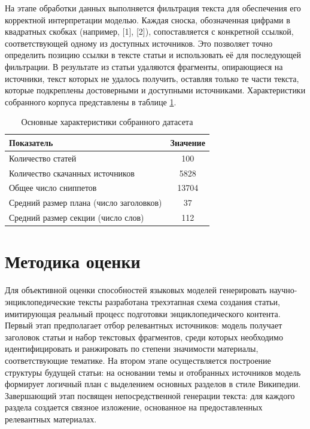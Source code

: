\documentclass{article}
\theoremstyle{definition}
\theoremstyle{plain}
\begin{document}
На этапе обработки данных выполняется фильтрация текста для обеспечения его корректной интерпретации моделью. 
Каждая сноска, обозначенная цифрами в квадратных скобках (например, [1], [2]), сопоставляется с конкретной ссылкой, соответствующей одному из доступных источников. 
Это позволяет точно определить позицию ссылки в тексте статьи и использовать её для последующей фильтрации. 
В результате из статьи удаляются фрагменты, опирающиеся на источники, текст которых не удалось получить, оставляя только те части текста,
которые подкреплены достоверными и доступными источниками. Характеристики собранного корпуса представлены в таблице \ref{tab:dataset}.

\begin{table}[htb]
  \centering
  \caption{Основные характеристики собранного датасета}
  \label{tab:dataset}
  \begin{tabular}{lc}
    \hline
    \textbf{Показатель} & \textbf{Значение} \\
    \hline
    Количество статей                             & 100    \\
    \hline
    Количество скачанных источников               & 5828  \\
    \hline
    Общее число сниппетов                         & 13704  \\
    \hline
    Средний размер плана (число заголовков)       & 37    \\
    \hline
    Средний размер секции (число слов)            & 112   \\
    \hline
  \end{tabular}
\end{table}


\section*{Методика оценки}
Для объективной оценки способностей языковых моделей генерировать научно-энциклопедические тексты разработана трехэтапная схема создания статьи, имитирующая реальный процесс подготовки энциклопедического контента. 
Первый этап предполагает отбор релевантных источников: модель получает заголовок статьи и набор текстовых фрагментов, среди которых необходимо идентифицировать и ранжировать по степени значимости материалы, соответствующие тематике. 
На втором этапе осуществляется построение структуры будущей статьи: на основании темы и отобранных источников модель формирует логичный план с выделением основных разделов в стиле Википедии. 
Завершающий этап посвящен непосредственной генерации текста: для каждого раздела создается связное изложение, основанное на предоставленных релевантных материалах. 
\end{document}
